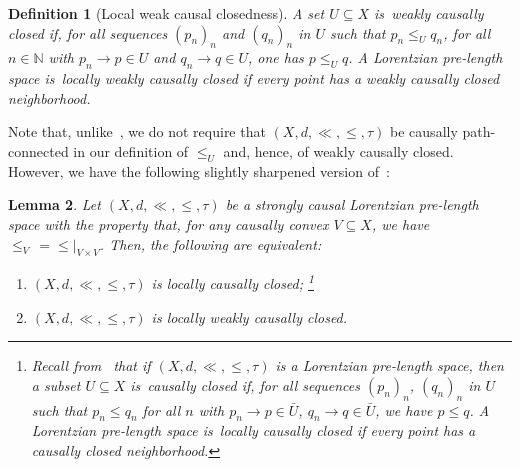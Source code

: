 \documentclass[a4paper,11pt]{article}
\numberwithin{equation}{section}
\theoremstyle{plain}
\newtheorem{Definition}{Definition}[section]
\newtheorem{Lemma}[Definition]{Lemma}
\theoremstyle{definition}
\newcommand{\N}{\mathbb N}
\newcommand{\LpLSn}{Lorentzian pre-length space}
\newcommand\LpLSmaths{\ensuremath{(X, d, \ll, \leq, \tau)}}
\begin{document}
\begin{Definition}[Local weak causal closedness]
A set $U \subseteq X$ is~\emph{weakly causally closed\/} if, for all sequences $\left( p_n \right)_n$ and $\left( q_n \right)_n$ in $U$ such that $p_n \le_U q_n$, for all $n \in \N$ with $p_n \to p \in U$ and $q_n \to q \in U$, one has $p \le_U q$. A Lorentzian pre-length space is~\emph{locally weakly causally closed\/} if every point has a weakly causally closed neighborhood.
\end{Definition}

Note that, unlike~\cite[Definitions~2.18 \& 2.19]{hau2020causal}, we do not require that {\LpLSmaths} be causally path-connected in our definition of $\le_U$ and, hence, of weakly causally closed. However, we have the following slightly sharpened version of~\cite[Prop.~2.21]{hau2020causal}:

\begin{Lemma}
\label{Lemma:2.21}
Let $\LpLSmaths$ be a strongly causal Lorentzian pre-length space with the property that, for any causally convex $V \subseteq X$, we have $\le_V \, = \left. \le \right|_{V \times V}$. Then, the following are equivalent: 
\begin{enumerate}
\item\label{221i} $\LpLSmaths$ is locally causally closed;%
\footnote{Recall from~\cite[Definition~3.4]{kunzinger2018lorentzian} that if {\LpLSmaths} is a {\LpLSn}, then a subset $U \subseteq X$ is~\emph{causally closed\/} if, for all sequences $(p_n)_n$, $(q_n)_n$ in $U$ such that $p_n \le q_n$ for all $n$  with $p_n \to p \in \bar{U}$, $q_n \to q \in \bar{U}$, we have $p \le q$. A {\LpLSn} is~\emph{locally causally closed\/} if every point has a causally closed neighborhood.}
\item\label{221ii} $\LpLSmaths$ is locally weakly causally closed.
\end{enumerate}
\end{Lemma}
\end{document}
